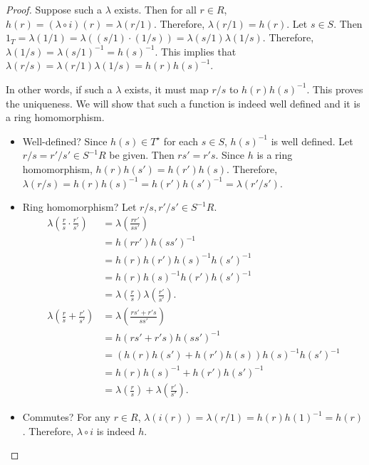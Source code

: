 \documentclass[12pt, psamsfonts]{amsart}
\theoremstyle{definition}
\theoremstyle{remark}
\numberwithin{equation}{section}
\begin{document}
\begin{proof}
  Suppose such a $\lambda$ exists.
  Then for all $r \in R$, $h(r) = (\lambda \circ i)(r) = \lambda(r / 1)$.
  Therefore, $\lambda(r / 1) = h(r)$.
  Let $s \in S$.
  Then $1_T = \lambda(1 / 1) = \lambda((s / 1) \cdot (1 / s)) = \lambda(s / 1)\lambda(1 / s)$.
  Therefore, $\lambda(1 / s) = \lambda(s / 1)^{-1} = h(s)^{-1}$.
  This implies that $\lambda(r / s) = \lambda(r / 1)\lambda(1 / s) = h(r)h(s)^{-1}$.

  In other words, if such a $\lambda$ exists, it must map $r / s$ to $h(r)h(s)^{-1}$.
  This proves the uniqueness.
  We will show that such a function is indeed well defined and it is a ring homomorphism.
  \begin{itemize}
    \item
      Well-defined?
      Since $h(s) \in T^{\star}$ for each $s \in S$, $h(s)^{-1}$ is well defined.
      Let $r / s = r' / s' \in S^{-1}R$ be given.
      Then $rs' = r's$.
      Since $h$ is a ring homomorphism, $h(r)h(s') = h(r')h(s)$.
      Therefore, $\lambda(r / s) = h(r)h(s)^{-1} = h(r')h(s')^{-1} = \lambda(r' / s')$.
    \item
      Ring homomorphism?
      Let $r / s, r' / s' \in S^{-1}R$.
      \begin{align*}
        \lambda(\frac{r}{s} \cdot \frac{r'}{s'})
          &= \lambda(\frac{rr'}{ss'}) \\ 
          &= h(rr')h(ss')^{-1} \\
          &= h(r)h(r')h(s)^{-1}h(s')^{-1} \\
          &= h(r)h(s)^{-1}h(r')h(s')^{-1} \\
          &= \lambda(\frac{r}{s})\lambda(\frac{r'}{s'}). \\
        \lambda(\frac{r}{s} + \frac{r'}{s'})
          &= \lambda(\frac{rs' + r's}{ss'}) \\
          &= h(rs' + r's)h(ss')^{-1} \\
          &= (h(r)h(s') + h(r')h(s))h(s)^{-1}h(s')^{-1} \\
          &= h(r)h(s)^{-1} + h(r')h(s')^{-1} \\
          &= \lambda(\frac{r}{s}) + \lambda(\frac{r'}{s'}).
      \end{align*}
    \item
      Commutes?
      For any $r \in R$, $\lambda(i(r)) = \lambda(r / 1) = h(r)h(1)^{-1} = h(r)$.
      Therefore, $\lambda \circ i$ is indeed $h$.
  \end{itemize}
\end{proof}
\end{document}
